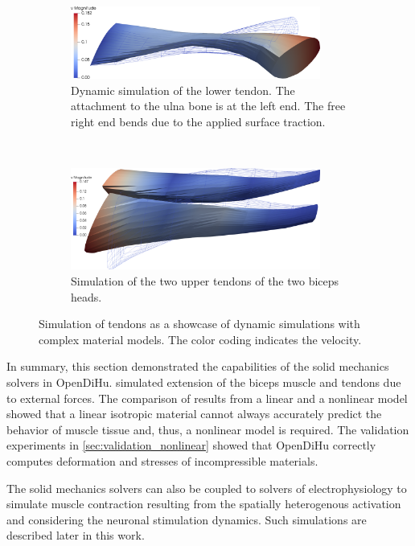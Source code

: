 \begin{figure}
  \centering%
  \begin{subfigure}[t]{\textwidth}%
    \centering%
    \includegraphics[width=0.9\textwidth]{images/results/basic/dynamic_mooney_rivlin_6.png}%
    \caption{Dynamic simulation of the lower tendon. The attachment to the ulna bone is at the left end. The free right end bends due to the applied surface traction.}%
    \label{fig:dynamic_mooney_rivlin_6}%
  \end{subfigure}\\[4mm]
  \begin{subfigure}[t]{\textwidth}%
    \centering%
    \includegraphics[width=0.9\textwidth]{images/results/basic/dynamic_mooney_rivlin_7.png}%
    \caption{Simulation of the two upper tendons of the two biceps heads.}%
    \label{fig:dynamic_mooney_rivlin_7}%
  \end{subfigure}
  \caption{Simulation of tendons as a showcase of dynamic simulations with complex material models. The color coding indicates the velocity.}%
  \label{fig:tendon_material_simulation}%
\end{figure}%

In summary, this section demonstrated the capabilities of the solid mechanics solvers in OpenDiHu.  simulated extension of the biceps muscle and tendons due to external forces. The comparison of results from a linear and a nonlinear model showed that a linear isotropic material cannot always accurately predict the behavior of muscle tissue and, thus, a nonlinear model is required. The validation experiments in \cref{sec:validation_nonlinear} showed that OpenDiHu correctly computes deformation and stresses of incompressible materials.

The solid mechanics solvers can also be coupled to solvers of electrophysiology to simulate muscle contraction resulting from the spatially heterogenous activation and considering the neuronal stimulation dynamics. Such simulations are described later in this work.




